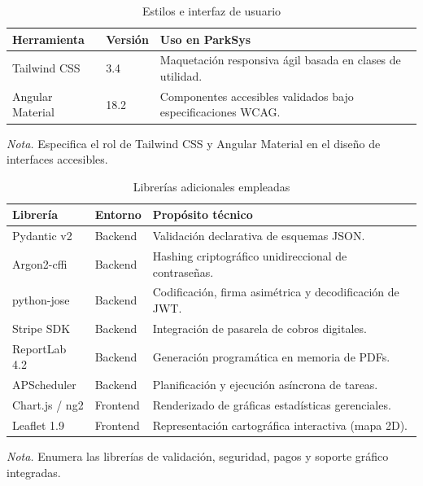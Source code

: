 

\begin{table}[htbp]
\caption{Estilos e interfaz de usuario}
\label{tab:estilos}
\begin{tabular}{@{}p{2.5cm} p{1.5cm} p{10cm}@{}}
\toprule
\textbf{Herramienta} & \textbf{Versión} & \textbf{Uso en ParkSys} \\
\midrule
Tailwind CSS & 3.4 & Maquetación responsiva ágil basada en clases de utilidad. \\
Angular Material & 18.2 & Componentes accesibles validados bajo especificaciones WCAG. \\
\bottomrule
\end{tabular}
\par\vspace{0.2cm}
\textit{Nota.} Especifica el rol de Tailwind CSS y Angular Material en el diseño de interfaces accesibles.
\end{table}

\begin{table}[htbp]
\caption{Librerías adicionales empleadas}
\label{tab:librerias}
\begin{tabular}{@{}p{2.5cm} p{1.5cm} p{10cm}@{}}
\toprule
\textbf{Librería} & \textbf{Entorno} & \textbf{Propósito técnico} \\
\midrule
Pydantic v2 & Backend & Validación declarativa de esquemas JSON. \\
Argon2-cffi & Backend & Hashing criptográfico unidireccional de contraseñas. \\
python-jose & Backend & Codificación, firma asimétrica y decodificación de JWT. \\
Stripe SDK & Backend & Integración de pasarela de cobros digitales. \\
ReportLab 4.2 & Backend & Generación programática en memoria de PDFs. \\
APScheduler & Backend & Planificación y ejecución asíncrona de tareas. \\
Chart.js / ng2 & Frontend & Renderizado de gráficas estadísticas gerenciales. \\
Leaflet 1.9 & Frontend & Representación cartográfica interactiva (mapa 2D). \\
\bottomrule
\end{tabular}
\par\vspace{0.2cm}
\textit{Nota.} Enumera las librerías de validación, seguridad, pagos y soporte gráfico integradas.
\end{table}

